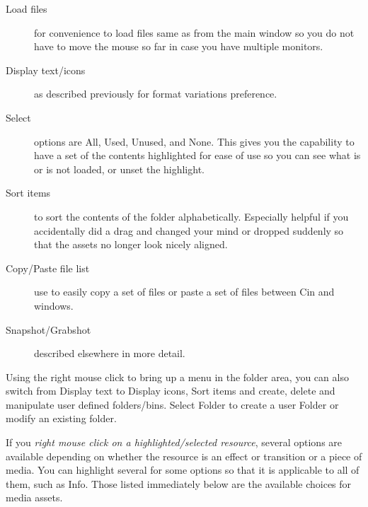 \begin{description}
    \item[ Load files ]  for convenience to load files same as from the main window so you do not have to move the mouse so far in case you have multiple monitors.
    \item[Display text/icons]  as described previously for format variations preference.
    \item[Select]  options are All, Used, Unused, and None.  This gives you the capability to have a set of the
        contents highlighted for ease of use so you can see what is or is not loaded, or unset the highlight.
    \item[Sort items]  to sort the contents of the folder alphabetically.  Especially helpful if you accidentally did a 
        drag and changed your mind or dropped suddenly so that the assets no longer look nicely aligned.
    \item[Copy/Paste file list]  use to easily copy a set of files or paste a set of files between Cin and windows.
    \item[Snapshot/Grabshot]  described elsewhere in more detail.
\end{description}

Using the right mouse click to bring up a menu in the folder area, you can also switch from Display text to Display icons, Sort items and create, delete and manipulate user defined folders/bins. Select Folder to create a user Folder or modify an existing folder.

If you \textit{right mouse click on a highlighted/selected resource}, several options are available depending on whether the resource is an effect or transition or a piece of media.  
You can highlight several for some options so that it is applicable to all of them, such as Info.  
Those listed immediately below are the available choices for media assets.


